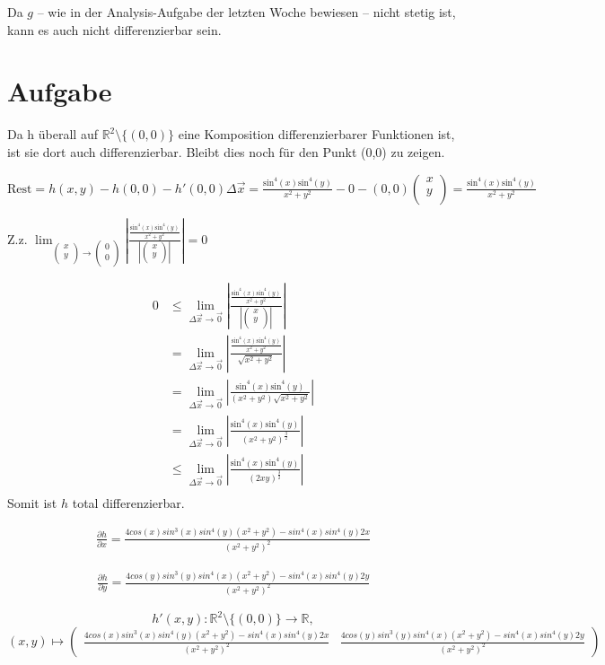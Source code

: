 \documentclass[10pt,a4paper,parskip=half]{scrartcl}
\newcommand{\vectwo}[2]{\left(\begin {array} {c} #1 \\ #2 \\ \end {array} \right)}
\begin{document}
\begin{enumerate}[(i)]
Da $g$ -- wie in der Analysis-Aufgabe der letzten Woche bewiesen -- nicht stetig ist, kann es auch nicht differenzierbar sein.
\section{Aufgabe}
Da h überall auf $\mathbb R^2\setminus{\{(0,0)\}}$ eine Komposition differenzierbarer Funktionen ist, ist sie dort auch differenzierbar. Bleibt dies noch für den Punkt (0,0) zu zeigen.

$\text{Rest} = h(x,y) - h(0,0) - h'(0,0) \Delta \vec x = \frac{\text{sin}^4(x)\text{sin}^4(y)}{x^2 + y^2} - 0 - (0,0) \vectwo{x}{y} = \frac{\text{sin}^4(x)\text{sin}^4(y)}{x^2 + y^2}$

Z.z. $\lim_{\vectwo{x}{y} \to \vectwo{0}{0}} \left|\frac{\frac{\text{sin}^4(x)\text{sin}^4(y)}{x^2 + y^2}}{\left|\vectwo{x}{y}\right|}\right| = 0$

\begin{align*}
0 &\le\lim_{\Delta \vec x \to \vec 0} \left|\frac{\frac{\text{sin}^4(x)\text{sin}^4(y)}{x^2 + y^2}}{\left|\vectwo{x}{y}\right|}\right| \\
&= \lim_{\Delta \vec x \to \vec 0} \left|\frac{\frac{\text{sin}^4(x)\text{sin}^4(y)}{x^2 + y^2}}{\sqrt{x^2+y^2}}\right| \\
&= \lim_{\Delta \vec x \to \vec 0} \left|\frac{\text{sin}^4(x)\text{sin}^4(y)}{(x^2 + y^2)\sqrt{x^2+y^2}}\right| \\
&= \lim_{\Delta \vec x \to \vec 0} \left|\frac{\text{sin}^4(x)\text{sin}^4(y)}{(x^2 + y^2)^{\frac{3}{2}}}\right| \\
&\le \lim_{\Delta \vec x \to \vec 0} \left|\frac{\text{sin}^4(x)\text{sin}^4(y)}{(2xy)^{\frac{3}{2}}}\right| \\
\end{align*}
Somit ist $h$ total differenzierbar.

\begin{align*}
\frac{\partial h}{\partial x} = \frac{4cos(x)sin^3(x)sin^4(y)(x^2 + y^2) - sin^4(x)sin^4(y)2x}{(x^2 + y^2)^2}
\end{align*}

\begin{align*}
\frac{\partial h}{\partial y} = \frac{4cos(y)sin^3(y)sin^4(x)(x^2 + y^2) - sin^4(x)sin^4(y)2y}{(x^2 + y^2)^2}
\end{align*}

\[
h'(x,y): \mathbb{R}^2\setminus{\{(0,0)\}} \to \mathbb{R}, 
\]
\[
(x,y) \mapsto \left( \begin{array}{cc} 
\frac{4cos(x)sin^3(x)sin^4(y)(x^2 + y^2) - sin^4(x)sin^4(y)2x}{(x^2 + y^2)^2} &
\frac{4cos(y)sin^3(y)sin^4(x)(x^2 + y^2) - sin^4(x)sin^4(y)2y}{(x^2 + y^2)^2}
\end{array}\right)
\]


\end{enumerate}
\end{document}
